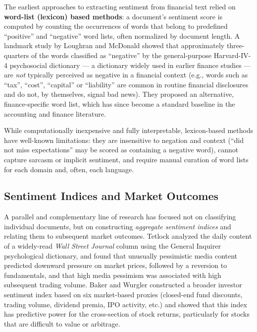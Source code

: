 The earliest approaches to extracting sentiment from financial text
relied on \textbf{word-list (lexicon) based methods}: a document's
sentiment score is computed by counting the occurrences of words that
belong to predefined ``positive'' and ``negative'' word lists, often
normalized by document length. A landmark study by Loughran and McDonald
\cite{loughranmcdonald2011} showed that approximately three-quarters of
the words classified as ``negative'' by the general-purpose Harvard-IV-4
psychosocial dictionary --- a dictionary widely used in earlier finance
studies --- are \emph{not} typically perceived as negative in a financial
context (e.g., words such as ``tax'', ``cost'', ``capital'' or
``liability'' are common in routine financial disclosures and do not, by
themselves, signal bad news). They proposed an alternative,
finance-specific word list, which has since become a standard baseline in
the accounting and finance literature.

While computationally inexpensive and fully interpretable, lexicon-based
methods have well-known limitations: they are insensitive to negation and
context (``did not miss expectations'' may be scored as containing a
negative word), cannot capture sarcasm or implicit sentiment, and require
manual curation of word lists for each domain and, often, each language.

\subsection{Sentiment Indices and Market Outcomes}
\label{sec:soa-sentiment-indices}

A parallel and complementary line of research has focused not on
classifying individual documents, but on constructing \emph{aggregate
sentiment indices} and relating them to subsequent market outcomes.
Tetlock \cite{tetlock2007} analyzed the daily content of a widely-read
\textit{Wall Street Journal} column using the General Inquirer
psychological dictionary, and found that unusually pessimistic media
content predicted downward pressure on market prices, followed by a
reversion to fundamentals, and that high media pessimism was associated
with high subsequent trading volume. Baker and Wurgler
\cite{baker2006} constructed a broader investor sentiment index based on
six market-based proxies (closed-end fund discounts, trading volume,
dividend premia, IPO activity, etc.) and showed that this index has
predictive power for the cross-section of stock returns, particularly for
stocks that are difficult to value or arbitrage.

